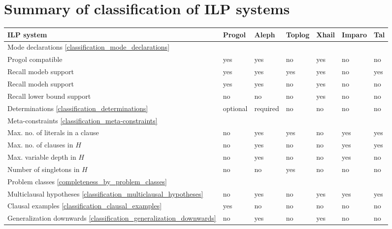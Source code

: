 \section{Summary of classification of ILP systems}\label{classification_summary}
\begin{center}
 \begin{tabular}{| l | l | l | l | l | l | l |}
    \hline
    ILP system & Progol & Aleph & Toplog & Xhail & Imparo & Tal \\ \hline
    \hline
    \multicolumn{7}{|l|}{Mode declarations \ref{classification_mode_declarations}} \\ \hline
    Progol compatible & yes & yes & no &  yes & no & no \\ \hline
    Recall modeb support & yes & yes & yes & yes & no & yes \\ \hline
    Recall modeh support & yes & yes & no & yes & no & no \\ \hline
    Recall lower bound support & no & no & no & yes & no & no \\ \hline
    \hline
    Determinations \ref{classification_determinations} & optional & required & no & no & no & no \\ \hline
    \hline
    \multicolumn{7}{|l|}{Meta-constraints \ref{classification_meta-constraints}} \\ \hline
    Max. no. of literals in a clause & no & yes & yes & no & yes & yes\\ \hline
    Max. no. of clauses in $H$ & no & yes & no & no & yes & yes\\ \hline
    Max. variable depth in $H$ & no & yes & no & no & yes & no\\ \hline
    Number of singletons in $H$ & no & no & yes & no & no & no\\ \hline    
    \hline
    
    \multicolumn{7}{|l|}{Problem classes \ref{completeness_by_problem_classes}} \\ \hline
    Multiclausal hypotheses \ref{classification_multiclausal_hypotheses}& no & yes & no & 
    yes & yes & yes \\ \hline
    
        \hline
    Clausal examples \ref{classification_clausal_examples}& yes & no & no & 
    no & no & no \\ \hline        
  	
  	Generalization downwards \ref{classification_generalization_downwards}
    & no & yes & no & yes & no & no \\ \hline


\end{tabular}
\end{center}
